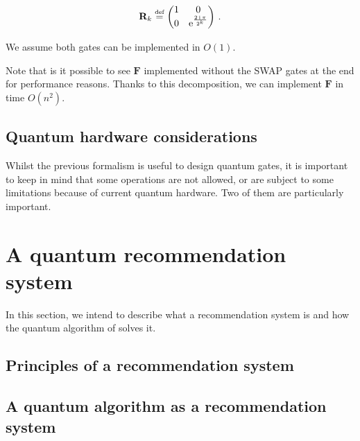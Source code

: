 \documentclass[11pt, a4paper]{article}
\begin{document}
\begin{definition}
                    \[\mathbf{R}_k\overset{\text{\tiny{def}}}{=}\begin{pmatrix}1 & 0\\0 & \mathrm{e}^{\frac{2\,\mathrm{i}\,\pi}{2^k}}\end{pmatrix}\,.\]
                    
                    We assume both gates can be implemented in \(O(1)\).
                    
                    Note that is it possible to see \(\mathbf{F}\) implemented without the SWAP gates at the end for performance reasons. Thanks to this decomposition, we can implement \(\mathbf{F}\) in time \(O\left(n^2\right)\).
                \end{definition}
                
                \begin{definition}
                    
                \end{definition}


        \subsection{Quantum hardware considerations}
            \label{subsec:Hardware}
            Whilst the previous formalism is useful to design quantum gates, it is important to keep in mind that some operations are not allowed, or are subject to some limitations because of current quantum hardware. Two of them are particularly important.
            
            
            
    \section{A quantum recommendation system}
        \label{sec:QRS}
        In this section, we intend to describe what a recommendation system is and how the quantum algorithm of \citeauthor{QRS} solves it.
        \subsection{Principles of a recommendation system}
        \subsection{A quantum algorithm as a recommendation system}
\end{document}
